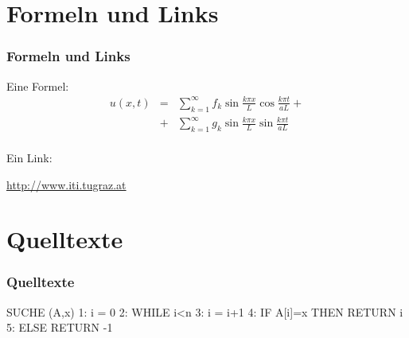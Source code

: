 \documentclass{beamer}
\begin{document}
\section{Formeln und Links}
\begin{frame}
	\frametitle{Formeln und Links}
	Eine Formel:
	\begin{eqnarray*}
	u(x,t) & = & \sum_{k=1}^{\infty} f_k \sin \frac{k \pi x}{L} \cos 
				 \frac{k \pi t}{aL} + \\
		   & + & \sum_{k=1}^{\infty} g_k \sin \frac{k \pi x}{L} \sin 
				 \frac{k \pi t}{aL} \\
	\end{eqnarray*}

	Ein Link:
	\begin{center}
		\url{http://www.iti.tugraz.at}		
	\end{center}
\end{frame}

\section{Quelltexte}
\begin{frame}[fragile]
	\frametitle{Quelltexte}
	\begin{spacing}{1}
	\begin{semiverbatim}
SUCHE (A,x)
1: i = 0
2: WHILE i<n
3:     i = i+1
4:     \alert{IF A[i]=x THEN RETURN i}
5: ELSE RETURN -1
	\end{semiverbatim}
	\end{spacing}
\end{frame}

\end{document}
